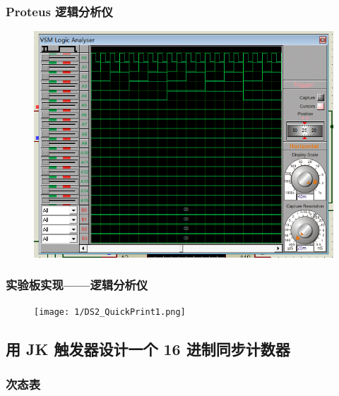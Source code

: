 \documentclass{article}
\begin{document}
\newpage

\subsubsection{Proteus 逻辑分析仪}

\begin{figure}[!hbp]
  \centering
  \includegraphics[scale=0.5]{1/2.png}
\end{figure}

\subsubsection{实验板实现——逻辑分析仪}

\begin{figure}[!hbp]
  \centering
  \texttt{[image: 1/DS2\_QuickPrint1.png]}
\end{figure}

\newpage

\subsection{用 JK 触发器设计一个 16 进制同步计数器}

\subsubsection{次态表}
\end{document}
